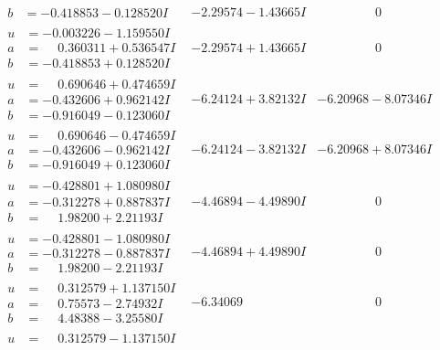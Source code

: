 \documentclass[1p]{elsarticle_modified}
\theoremstyle{definition}
\begin{document}
$$\begin{array}{c|c|c}
\begin{aligned}
b &= -0.418853 - 0.128520 I\end{aligned}
 & -2.29574 - 1.43665 I & \phantom{-0.000000 } 0 \\ \hline\begin{aligned}
u &= -0.003226 - 1.159550 I \\
a &= \phantom{-}0.360311 + 0.536547 I \\
b &= -0.418853 + 0.128520 I\end{aligned}
 & -2.29574 + 1.43665 I & \phantom{-0.000000 } 0 \\ \hline\begin{aligned}
u &= \phantom{-}0.690646 + 0.474659 I \\
a &= -0.432606 + 0.962142 I \\
b &= -0.916049 - 0.123060 I\end{aligned}
 & -6.24124 + 3.82132 I & -6.20968 - 8.07346 I \\ \hline\begin{aligned}
u &= \phantom{-}0.690646 - 0.474659 I \\
a &= -0.432606 - 0.962142 I \\
b &= -0.916049 + 0.123060 I\end{aligned}
 & -6.24124 - 3.82132 I & -6.20968 + 8.07346 I \\ \hline\begin{aligned}
u &= -0.428801 + 1.080980 I \\
a &= -0.312278 + 0.887837 I \\
b &= \phantom{-}1.98200 + 2.21193 I\end{aligned}
 & -4.46894 - 4.49890 I & \phantom{-0.000000 } 0 \\ \hline\begin{aligned}
u &= -0.428801 - 1.080980 I \\
a &= -0.312278 - 0.887837 I \\
b &= \phantom{-}1.98200 - 2.21193 I\end{aligned}
 & -4.46894 + 4.49890 I & \phantom{-0.000000 } 0 \\ \hline\begin{aligned}
u &= \phantom{-}0.312579 + 1.137150 I \\
a &= \phantom{-}0.75573 - 2.74932 I \\
b &= \phantom{-}4.48388 - 3.25580 I\end{aligned}
 & -6.34069\phantom{ +0.000000I} & \phantom{-0.000000 } 0 \\ \hline\begin{aligned}
u &= \phantom{-}0.312579 - 1.137150 I \\

\end{aligned}
\end{array}$$
\end{document}
